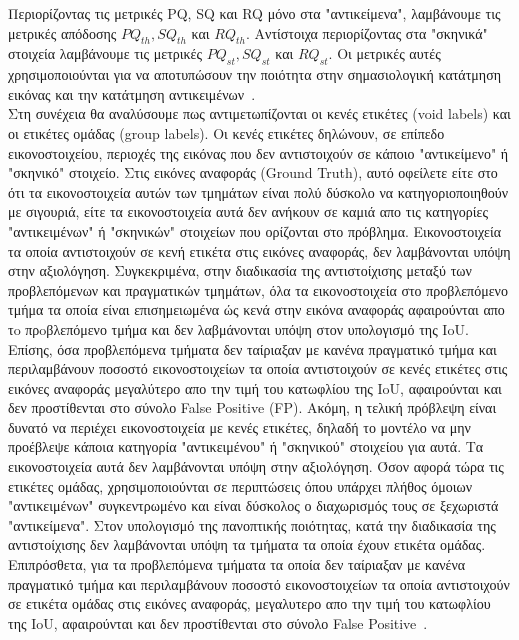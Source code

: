 \documentclass[12pt]{article}
\numberwithin{equation}{section}
\begin{document}
\noindent Περιορίζοντας τις μετρικές PQ, SQ και RQ μόνο στα "αντικείμενα", λαμβάνουμε τις μετρικές απόδοσης \(PQ_{th}, SQ_{th}\) και \(RQ_{th}\). Αντίστοιχα περιορίζοντας στα "σκηνικά" στοιχεία λαμβάνουμε τις μετρικές \(PQ_{st}, SQ_{st}\) και \(RQ_{st}\). Οι μετρικές αυτές χρησιμοποιούνται για να αποτυπώσουν την ποιότητα στην σημασιολογική κατάτμηση εικόνας και την κατάτμηση αντικειμένων~\cite{elharrouss2021panopticsegmentationreview}.\\

\noindent Στη συνέχεια θα αναλύσουμε πως αντιμετωπίζονται οι κενές ετικέτες (void labels) και οι ετικέτες ομάδας (group labels). Οι κενές ετικέτες δηλώνουν, σε επίπεδο εικονοστοιχείου, περιοχές της εικόνας που δεν αντιστοιχούν σε κάποιο "αντικείμενο" ή "σκηνικό" στοιχείο. Στις εικόνες αναφοράς (Ground Truth), αυτό οφείλετε είτε στο ότι τα εικονοστοιχεία αυτών των τμημάτων είναι πολύ δύσκολο να κατηγοριοποιηθούν με σιγουριά, είτε τα εικονοστοιχεία αυτά δεν ανήκουν σε καμιά απο τις κατηγορίες "αντικειμένων" ή "σκηνικών" στοιχείων που ορίζονται στο πρόβλημα. Εικονοστοιχεία τα οποία αντιστοιχούν σε κενή ετικέτα στις εικόνες αναφοράς, δεν λαμβάνονται υπόψη στην αξιολόγηση. Συγκεκριμένα, στην διαδικασία της αντιστοίχισης μεταξύ των προβλεπόμενων και πραγματικών τμημάτων, όλα τα εικονοστοιχεία στο προβλεπόμενο τμήμα τα οποία είναι επισημειωμένα ώς κενά στην εικόνα αναφοράς αφαιρούνται απο τo πρoβλεπόμενο τμήμα και δεν λαβμάνονται υπόψη στον υπολογισμό της IoU. Επίσης, όσα προβλεπόμενα τμήματα δεν ταίριαξαν με κανένα πραγματικό τμήμα και περιλαμβάνουν ποσοστό εικονοστοιχείων τα οποία αντιστοιχούν σε κενές ετικέτες στις εικόνες αναφοράς μεγαλύτερο απο την τιμή του κατωφλίου της IoU, αφαιρούνται και δεν προστίθενται στο σύνολο False Positive (FP).  Ακόμη, η τελική πρόβλεψη είναι δυνατό να περιέχει εικονοστοιχεία με κενές ετικέτες, δηλαδή το μοντέλο να μην προέβλεψε κάποια κατηγορία "αντικειμένου" ή "σκηνικού" στοιχείου για αυτά. Τα εικονοστοιχεία αυτά δεν λαμβάνονται υπόψη στην αξιολόγηση. Όσον αφορά τώρα τις ετικέτες ομάδας, χρησιμοποιούνται σε περιπτώσεις όπου υπάρχει πλήθος όμοιων "αντικειμένων" συγκεντρωμένο και είναι δύσκολος ο διαχωρισμός τους σε ξεχωριστά "αντικείμενα". Στον υπολογισμό της πανοπτικής ποιότητας, κατά την διαδικασία της αντιστοίχισης δεν λαμβάνονται υπόψη τα τμήματα τα οποία έχουν ετικέτα ομάδας. Επιπρόσθετα, για τα προβλεπόμενα τμήματα τα οποία δεν ταίριαξαν με κανένα πραγματικό τμήμα και περιλαμβάνουν ποσοστό εικονοστοιχείων τα οποία αντιστοιχούν σε ετικέτα ομάδας στις εικόνες αναφοράς, μεγαλυτερο απο την τιμή του κατωφλίου της IoU, αφαιρούνται και δεν προστίθενται στο σύνολο False Positive~\cite{Kirillov_2019_CVPR}.
\newpage
\end{document}
